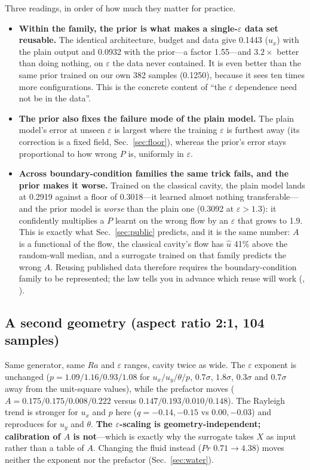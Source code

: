 \documentclass[11pt,a4paper]{article}
\begin{document}
Three readings, in order of how much they matter for practice.

\begin{itemize}
\item \textbf{Within the family, the prior is what makes a single-$\varepsilon$ data set reusable.}
The identical architecture, budget and data give 0.1443 ($u_x$) with the plain output and 0.0932
with the prior---a factor 1.55---and $3.2\times$ better than doing nothing, on $\varepsilon$ the
data never contained. It is even better than the same prior trained on our own 382 samples
(0.1250), because it sees ten times more configurations. This is the concrete content of ``the
$\varepsilon$ dependence need not be in the data''.
\item \textbf{The prior also fixes the failure mode of the plain model.} The plain model's error at
unseen $\varepsilon$ is largest where the training $\varepsilon$ is furthest away (its correction
is a fixed field, Sec.~\ref{sec:floor}), whereas the prior's error stays proportional to how wrong
$P$ is, uniformly in $\varepsilon$.
\item \textbf{Across boundary-condition families the same trick fails, and the prior makes it
worse.} Trained on the classical cavity, the plain model lands at 0.2919 against a floor of
0.3018---it learned almost nothing transferable---and the prior model is \emph{worse} than the
plain one (0.3092 at $\varepsilon>1.3$): it confidently multiplies a $P$ learnt on the wrong flow by
an $\varepsilon$ that grows to 1.9. This is exactly what Sec.~\ref{sec:public} predicts, and it is
the same number: $A$ is a functional of the flow, the classical cavity's flow has $\hat u$ 41\%
above the random-wall median, and a surrogate trained on that family predicts the wrong $A$.
Reusing published data therefore requires the boundary-condition family to be represented; the law
tells you in advance which reuse will work (,
).
\end{itemize}

\subsection{A second geometry (aspect ratio 2:1, 104 samples)}
\label{sec:aspect}

Same generator, same $Ra$ and $\varepsilon$ ranges, cavity twice as wide. The $\varepsilon$
exponent is unchanged ($p=1.09/1.16/0.93/1.08$ for $u_x/u_y/\theta/p$, $0.7\sigma$, $1.8\sigma$,
$0.3\sigma$ and $0.7\sigma$ away from the unit-square values), while the prefactor moves
($A=0.175/0.175/0.008/0.222$ versus $0.147/0.193/0.010/0.148$). The Rayleigh trend is stronger for
$u_x$ and $p$ here ($q=-0.14,-0.15$ vs $0.00,-0.03$) and reproduces for $u_y$ and $\theta$.
\textbf{The $\varepsilon$-scaling is geometry-independent; calibration of $A$ is not}---which is
exactly why the surrogate takes $X$ as input rather than a table of $A$. Changing the fluid instead
($Pr$ $0.71\to4.38$) moves neither the exponent nor the prefactor (Sec.~\ref{sec:water}).
\end{document}
